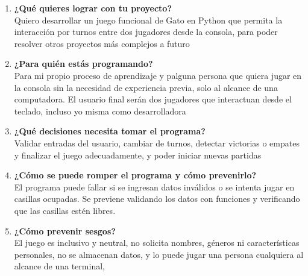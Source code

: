 \documentclass[a4paper,12pt]{article}
\begin{document}
\begin{enumerate}

  \item \textbf{¿Qué quieres lograr con tu proyecto?} \\

  Quiero desarrollar un juego funcional de Gato en Python que permita la interacción por turnos entre dos jugadores  desde la consola, para poder resolver otros proyectos más complejos a futuro 



  \item \textbf{¿Para quién estás programando?} \\ 
  Para mi propio proceso de aprendizaje y palguna persona que quiera jugar en la consola sin la necesidad de experiencia previa, solo al alcance de una computadora. El usuario final serán dos jugadores que interactuan desde el teclado, incluso yo misma como desarrolladora

  \item \textbf{¿Qué decisiones necesita tomar el programa?} \\ 
  Validar entradas del usuario, cambiar de turnos, detectar victorias o empates y finalizar el juego adecuadamente, y poder iniciar nuevas partidas

  \item \textbf{¿Cómo se puede romper el programa y cómo prevenirlo?} \\ 
  El programa puede fallar si se ingresan datos inválidos o se intenta jugar en casillas ocupadas. Se previene validando los datos con funciones y verificando que las casillas estén libres.

  \item \textbf{¿Cómo prevenir sesgos?} \\ 
  El juego es inclusivo y neutral, no solicita nombres, géneros ni características personales, no se almacenan datos, y lo puede jugar una persona cualquiera al alcance de una terminal, 

\end{enumerate}
\end{document}
